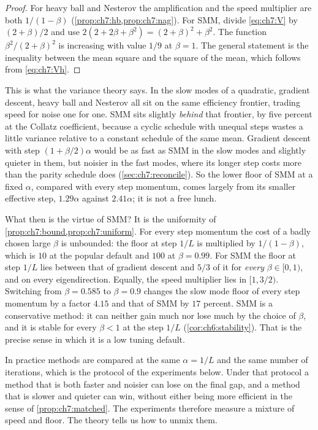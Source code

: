 \begin{proof}
For heavy ball and Nesterov the amplification and the speed multiplier are
both $1/(1-\beta)$ (\cref{prop:ch7:hb,prop:ch7:nag}). For SMM, divide
\eqref{eq:ch7:V} by $(2+\beta)/2$ and use $2(2+2\beta+\beta^2)=(2+\beta)^2+\beta^2$.
The function $\beta^2/(2+\beta)^2$ is increasing with value $1/9$ at $\beta=1$.
The general statement is the inequality between the mean square and the
square of the mean, which follows from \eqref{eq:ch7:Vh}.
\end{proof}

This is what the variance theory says. In the slow modes of a
quadratic, gradient descent, heavy ball and Nesterov all sit on the same
efficiency frontier, trading speed for noise one for one. SMM sits slightly \emph{behind} that frontier, by five percent at the
Collatz coefficient, because a cyclic schedule with unequal steps wastes a
little variance relative to a constant schedule of the same mean.
Gradient descent with step $(1+\beta/2)\alpha$ would be as fast as SMM in the slow modes and slightly quieter in them, but noisier in the fast modes, where its longer step costs more than the parity schedule does (\cref{sec:ch7:reconcile}).
So the lower floor of SMM at a fixed $\alpha$, compared
with every step momentum, comes largely from its smaller effective step,
$1.29\alpha$ against $2.41\alpha$; it is not a free lunch.

What then is the virtue of SMM? It is the uniformity of \cref{prop:ch7:bound,prop:ch7:uniform}.
For every step momentum the cost of a badly chosen large $\beta$ is unbounded:
the floor at step $1/L$ is multiplied by $1/(1-\beta)$, which is $10$ at the
popular default and $100$ at $\beta=0.99$. For SMM the floor at step $1/L$ lies between that of gradient descent and
$5/3$ of it for \emph{every} $\beta\in[0,1)$, and on every eigendirection.
Equally, the speed multiplier lies in $[1,3/2)$. Switching from $\beta=0.585$
to $\beta=0.9$ changes the slow mode floor of every step momentum by a factor
$4.15$ and that of SMM by $17$ percent. SMM is a conservative method: it can
neither gain much nor lose much by the choice of $\beta$, and it is stable for
every $\beta<1$ at the step $1/L$ (\cref{cor:ch6:stability}). That is the
precise sense in which it is a low tuning default.

\begin{remark}\label{rem:ch7:budget}
In practice methods are compared at the same $\alpha=1/L$ and the same number
of iterations, which is the protocol of the experiments below. Under that
protocol a method that is both faster and noisier can lose on the final gap,
and a method that is slower and quieter can win, without either being more
efficient in the sense of \cref{prop:ch7:matched}. The experiments therefore
measure a mixture of speed and floor. The theory tells us how to unmix them.
\end{remark}

